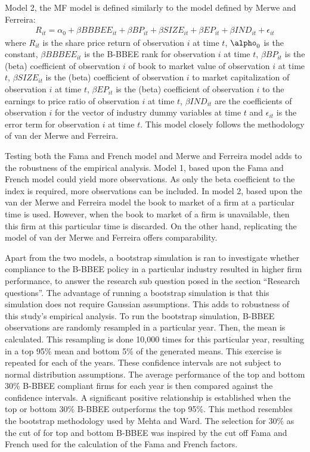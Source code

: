 Model 2, the MF model is defined similarly to the model defined by Merwe and Ferreira:
\begin{equation}
\begin{aligned} %
    R_{it} = \alpha_0 + \beta BBBEE_{it} + \beta BP_{it} + \beta SIZE_{it}     + \beta EP_{it} + \beta IND_{it} + \epsilon_{it}
\end{aligned}
\end{equation}
where $R_{it}$ is the share price return of observation $i$ at time $t$, $\alpho_0$ is the constant, $\beta BBBEE_{it}$ is the B-BBEE rank  for observation $i$ at time $t$, $\beta BP_{it}$ is the (beta) coefficient of observation $i$ of book to market value of observation $i$ at time $t$, $\beta SIZE_{it}$ is the (beta) coefficient of observation $i$ to market capitalization of observation $i$ at time $t$, $\beta EP_{it}$ is the (beta) coefficient of observation $i$ to the earnings to price ratio of observation $i$ at time $t$, $\beta IND_{it}$ are the coefficients of observation $i$ for the vector of industry dummy variables at time $t$ and $\epsilon_{it}$ is the error term for observation $i$ at time $t$. This model closely follows the methodology of van der Merwe and Ferreira. 

Testing both the Fama and French model and Merwe and Ferreira model adds to the robustness of the empirical analysis. Model 1, based upon the Fama and French model could yield more observations. As only the beta coefficient to the index is required, more observations can be included. In model 2, based upon the van der Merwe and Ferreira model the book to market of a firm at a particular time is used. However, when the book to market of a firm is unavailable, then this firm at this particular time is discarded. On the other hand,  replicating the model of van der Merwe and Ferreira offers comparability.

Apart from the two models, a bootstrap simulation is ran to investigate whether compliance to the B-BBEE policy in a particular industry resulted in higher firm performance, to answer the research sub question posed in the section “Research questions”. The advantage of running a bootstrap simulation is that this simulation does not require Gaussian assumptions. This adds to robustness of this study’s empirical analysis. To run the bootstrap simulation, B-BBEE observations are randomly resampled in a particular year. Then, the mean is calculated. This resampling is done 10,000 times for this particular year, resulting in a top 95\% mean and bottom 5\% of the generated means. This exercise is repeated for each of the years. These confidence intervals are not subject to normal distribution assumptions. The average performance of the top and bottom 30\% B-BBEE compliant firms for each year is then compared against the confidence intervals. A significant positive relationship is established when the top or bottom 30\% B-BBEE outperforms the top 95\%. This method resembles the bootstrap methodology used by Mehta and Ward. The selection for 30\% as the cut of for top and bottom B-BBEE was inspired by the cut off Fama and French used for the calculation of the Fama and French factors.
